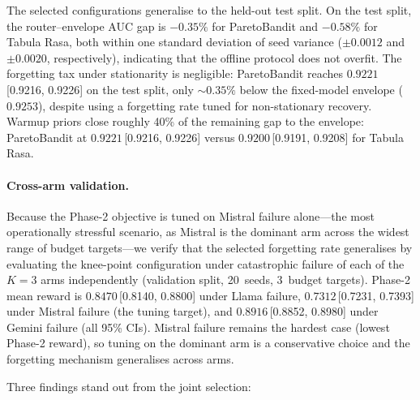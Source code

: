 The selected configurations generalise to the held-out test split.
On the test split, the router--envelope AUC gap is $-0.35\%$ for
ParetoBandit and $-0.58\%$ for Tabula Rasa, both within one standard
deviation of seed variance ($\pm 0.0012$ and $\pm 0.0020$,
respectively), indicating that the offline protocol does not overfit.
The forgetting tax under stationarity is negligible:
ParetoBandit reaches $0.9221$\,[0.9216, 0.9226] on the test split,
only ${\sim}0.35\%$ below the fixed-model envelope ($0.9253$),
despite using a forgetting rate tuned for non-stationary recovery.
Warmup priors close roughly 40\% of the remaining gap to the
envelope: ParetoBandit at $0.9221$\,[0.9216, 0.9226] versus
$0.9200$\,[0.9191, 0.9208] for Tabula Rasa.

\paragraph{Cross-arm validation.}
Because the Phase-2 objective is tuned on Mistral failure
alone---the most operationally stressful scenario, as Mistral is the
dominant arm across the widest range of budget targets---we verify
that the selected forgetting rate generalises by evaluating the
knee-point configuration under catastrophic failure of each of the
$K{=}3$ arms independently (validation split, 20~seeds, 3~budget
targets).
Phase-2 mean reward is $0.8470$\,[0.8140, 0.8800] under Llama
failure, $0.7312$\,[0.7231, 0.7393] under Mistral failure (the
tuning target), and $0.8916$\,[0.8852, 0.8980] under Gemini failure
(all 95\% CIs).
Mistral failure remains the hardest case (lowest Phase-2 reward),
so tuning on the dominant arm is a conservative choice and the
forgetting mechanism generalises across arms.

Three findings stand out from the joint selection:

